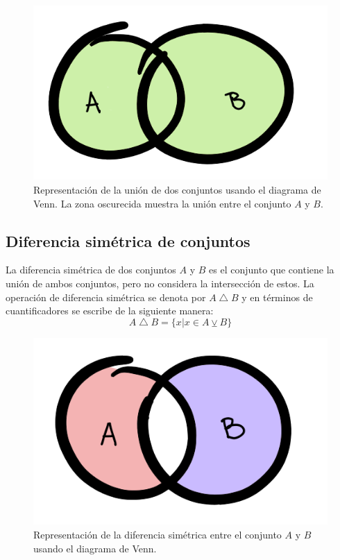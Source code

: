 \begin{center}
	\begin{figure}[ht!]
	\centering
    		\includegraphics[scale=0.4]{FiguresBM/union.png}
    		\caption[Representación de la unión de dos conjuntos]{Representación de la unión de dos conjuntos usando el diagrama de Venn. La zona oscurecida muestra la unión entre el conjunto $A$ y $B$.}
	\end{figure}
\end{center}

\subsection{Diferencia simétrica de conjuntos}
La diferencia simétrica de dos conjuntos $A$ y $B$ es el conjunto que contiene la unión de ambos conjuntos, pero no considera la intersección de estos. La operación de diferencia simétrica se denota por $A\bigtriangleup B$ y en términos de cuantificadores se escribe de la siguiente manera:
\begin{equation*}
A\bigtriangleup B=\{x|x\in A\veebar B\}
\end{equation*}

\begin{center}
	\begin{figure}[ht!]
	\centering
    		\includegraphics[scale=0.42]{FiguresBM/diferencias.png}
    		\caption[Representación de la diferencia simétrica entre el conjunto $A$ y $B$ ]{Representación de la diferencia simétrica entre el conjunto $A$ y $B$ usando el diagrama de Venn.}
	\end{figure}
\end{center}

